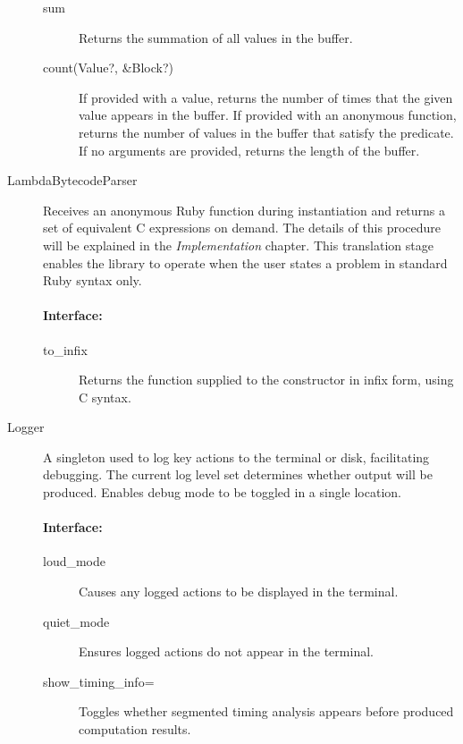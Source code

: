 \begin{description}
\begin{description}
  \item[sum] Returns the summation of all values in the buffer.

  \item[count(Value?, \&Block?)] If provided with a value, returns the number of times that the given value appears in the buffer. If provided with an anonymous function, returns the number of values in the buffer that satisfy the predicate. If no arguments are provided, returns the length of the buffer.
\end{description}

\item[LambdaBytecodeParser]
Receives an anonymous Ruby function during instantiation and returns a set of equivalent C expressions on demand. The details of this procedure will be explained in the \emph{Implementation} chapter. This translation stage enables the library to operate when the user states a problem in standard Ruby syntax only.

\paragraph*{Interface:}
\begin{description}
  \item[to\_infix] Returns the function supplied to the constructor in infix form, using C syntax.
\end{description}

\item[Logger]
A singleton used to log key actions to the terminal or disk, facilitating debugging. The current log level set determines whether output will be produced. Enables debug mode to be toggled in a single location.

\paragraph*{Interface:}
\begin{description}
  \item[loud\_mode] Causes any logged actions to be displayed in the terminal.

  \item[quiet\_mode] Ensures logged actions do not appear in the terminal.

  \item[show\_timing\_info=] Toggles whether segmented timing analysis appears before produced computation results.
\end{description}


\end{description}
